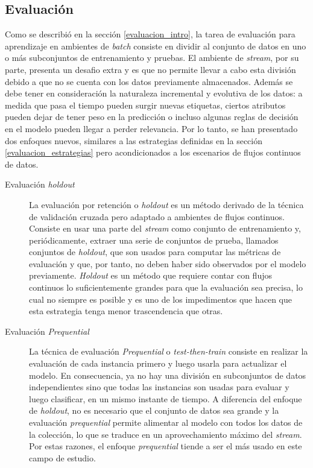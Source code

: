 
\subsection{Evaluación}

Como se describió en la sección \ref{evaluacion_intro}, la tarea de evaluación
para aprendizaje en ambientes de \textit{batch} consiste en dividir al conjunto
de datos en uno o más subconjuntos de entrenamiento y pruebas.  El ambiente de
\textit{stream}, por su parte, presenta un desafio extra y es que no permite
llevar a cabo esta división debido a que no se cuenta con los datos previamente
almacenados. Además se debe tener en consideración la naturaleza incremental y
evolutiva de los datos: a medida que pasa el tiempo pueden surgir nuevas
etiquetas, ciertos atributos pueden dejar de tener peso en la predicción o
incluso algunas reglas de decisión en el modelo pueden llegar a perder
relevancia. Por lo tanto, se han presentado dos enfoques nuevos, similares a las
estrategias definidas en la sección \ref{evaluacion_estrategias} pero
acondicionados a los escenarios de flujos continuos de datos.

\begin{description} 

   \item[Evaluación \textit{holdout}] La evaluación por retención o
      \textit{holdout} es un método derivado de la técnica de validación cruzada
      pero adaptado a ambientes de flujos continuos. Consiste en usar una parte
      del \textit{stream} como conjunto de entrenamiento y, periódicamente,
      extraer una serie de conjuntos de prueba, llamados conjuntos de
      \textit{holdout}, que son usados para computar las métricas de evaluación
      y que, por tanto, no deben haber sido observados por el modelo
      previamente.  \textit{Holdout} es un método que requiere contar con flujos
      continuos lo suficientemente grandes para que la evaluación sea precisa,
      lo cual no siempre es posible y es uno de los impedimentos que hacen que
      esta estrategia tenga menor trascendencia que otras.

   \item[Evaluación \textit{Prequential}] La técnica de evaluación
      \textit{Prequential} o \textit{test-then-train} consiste en realizar la
      evaluación de cada instancia primero y luego usarla para actualizar el
      modelo. En consecuencia, ya no hay una división en subconjuntos de datos
      independientes sino que todas las instancias son usadas para evaluar y
      luego clasificar, en un mismo instante de tiempo. A diferencia del enfoque
      de \textit{holdout}, no es necesario que el conjunto de datos sea grande y
      la evaluación \textit{prequential} permite alimentar al modelo con todos
      los datos de la colección, lo que se traduce en un aprovechamiento máximo
      del \textit{stream}. Por estas razones, el enfoque \textit{prequential}
      tiende a ser el más usado en este campo de estudio.

\end{description} 

